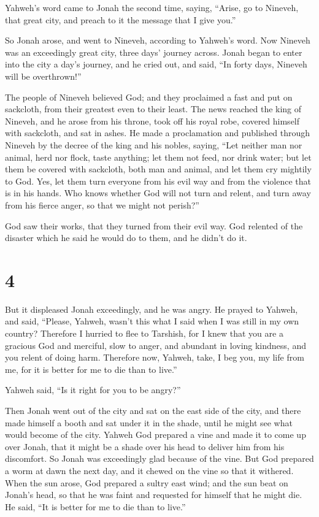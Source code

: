  Yahweh's word came to Jonah the second time, saying,
 ``Arise, go to Nineveh, that great city, and preach to it
the message that I give you.''

 So Jonah arose, and went to Nineveh, according to
Yahweh's word. Now Nineveh was an exceedingly great city, three days'
journey across.  Jonah began to enter into the city a
day's journey, and he cried out, and said, ``In forty days, Nineveh will
be overthrown!''

 The people of Nineveh believed God; and they proclaimed a
fast and put on sackcloth, from their greatest even to their least.
 The news reached the king of Nineveh, and he arose from
his throne, took off his royal robe, covered himself with sackcloth, and
sat in ashes.  He made a proclamation and published
through Nineveh by the decree of the king and his nobles, saying, ``Let
neither man nor animal, herd nor flock, taste anything; let them not
feed, nor drink water;  but let them be covered with
sackcloth, both man and animal, and let them cry mightily to God. Yes,
let them turn everyone from his evil way and from the violence that is
in his hands.  Who knows whether God will not turn and
relent, and turn away from his fierce anger, so that we might not
perish?''

 God saw their works, that they turned from their evil
way. God relented of the disaster which he said he would do to them, and
he didn't do it.

\hypertarget{section-3}{%
\section{4}\label{section-3}}

 But it displeased Jonah exceedingly, and he was angry.
 He prayed to Yahweh, and said, ``Please, Yahweh, wasn't
this what I said when I was still in my own country? Therefore I hurried
to flee to Tarshish, for I knew that you are a gracious God and
merciful, slow to anger, and abundant in loving kindness, and you relent
of doing harm.  Therefore now, Yahweh, take, I beg you, my
life from me, for it is better for me to die than to live.''

 Yahweh said, ``Is it right for you to be angry?''

 Then Jonah went out of the city and sat on the east side
of the city, and there made himself a booth and sat under it in the
shade, until he might see what would become of the city. 
Yahweh God prepared a vine and made it to come up over Jonah, that it
might be a shade over his head to deliver him from his discomfort. So
Jonah was exceedingly glad because of the vine.  But God
prepared a worm at dawn the next day, and it chewed on the vine so that
it withered.  When the sun arose, God prepared a sultry
east wind; and the sun beat on Jonah's head, so that he was faint and
requested for himself that he might die. He said, ``It is better for me
to die than to live.''

